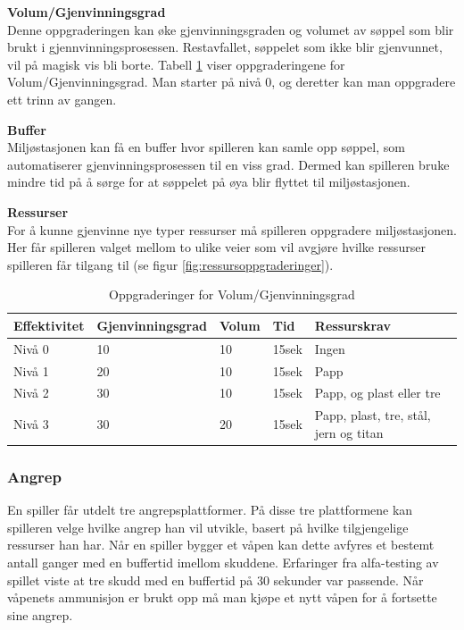 \begin{description}
	\item \textbf{Volum/Gjenvinningsgrad}\\
		Denne oppgraderingen kan øke gjenvinningsgraden og volumet av
søppel som blir brukt i gjennvinningsprosessen. Restavfallet, søppelet
som ikke blir gjenvunnet, vil på magisk vis bli borte. Tabell
\ref{tab:effektivitet} viser oppgraderingene for Volum/Gjenvinningsgrad.
Man starter på nivå 0, og deretter kan man oppgradere ett trinn av
gangen.
	\item \textbf{Buffer}\\
		Miljøstasjonen kan få en buffer hvor spilleren kan samle opp søppel, som automatiserer gjenvinningsprosessen til en viss grad. Dermed kan spilleren bruke mindre tid på å sørge for at søppelet på øya blir flyttet til miljøstasjonen.
	\item \textbf{Ressurser}\\
		For å kunne gjenvinne nye typer ressurser må spilleren oppgradere miljøstasjonen. Her får spilleren valget mellom to ulike veier som vil avgjøre hvilke ressurser spilleren får tilgang til (se figur \ref{fig:ressursoppgraderinger}).
\end{description}

\begin{table}
	\begin{tabular}[\textwidth]{ l  l  p{3cm}  l  p{4cm} }
		\hline
		\bf{Effektivitet} & \bf{Gjenvinningsgrad} & \bf{Volum} & \bf{Tid} & \bf{Ressurskrav} \\
		\hline
		Nivå 0 & 10 & 10 & 15sek & Ingen  \\
		Nivå 1 & 20 & 10 & 15sek & Papp \\
		Nivå 2 & 30 & 10 & 15sek & Papp, og plast eller tre \\
		Nivå 3 & 30 & 20 & 15sek & Papp, plast, tre, stål, jern og titan \\
		\hline
	\end{tabular}
	\caption{Oppgraderinger for Volum/Gjenvinningsgrad}
	\label{tab:effektivitet}
\end{table}


\subsubsection{Angrep}
En spiller får utdelt tre angrepsplattformer. På disse tre plattformene
kan spilleren velge hvilke angrep han vil utvikle, basert på hvilke
tilgjengelige ressurser han har. Når en spiller bygger et våpen kan dette avfyres et bestemt antall ganger med en buffertid imellom skuddene. Erfaringer fra alfa-testing av spillet viste at tre skudd med en buffertid på 30 sekunder var passende. Når våpenets ammunisjon er brukt opp må man kjøpe et nytt våpen for å fortsette sine angrep. 

